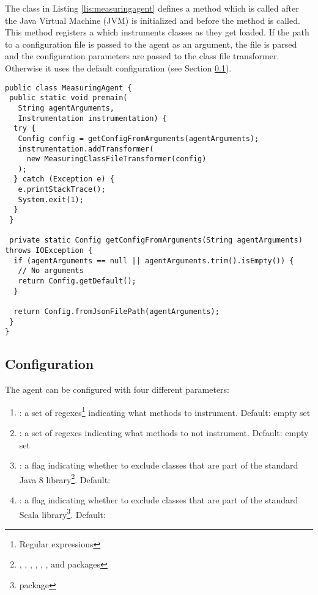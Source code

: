 \noindent The  class in Listing \ref{lis:measuringagent} defines a  method which is called after the Java Virtual Machine (JVM) is initialized and before the  method is called. This method registers a  which instruments classes as they get loaded. If the path to a configuration file is passed to the agent as an argument, the file is parsed and the configuration parameters are passed to the class file transformer. Otherwise it uses the default configuration (see Section \ref{sec:implementation:agent:configuration}).

\begin{lstlisting}[breaklines,caption={$MeasuringAgent$ class},label=lis:measuringagent]
public class MeasuringAgent {
 public static void premain(
   String agentArguments,
   Instrumentation instrumentation) {
  try {
   Config config = getConfigFromArguments(agentArguments);
   instrumentation.addTransformer(
     new MeasuringClassFileTransformer(config)
   );
  } catch (Exception e) {
   e.printStackTrace();
   System.exit(1);
  }
 }

 private static Config getConfigFromArguments(String agentArguments) throws IOException {
  if (agentArguments == null || agentArguments.trim().isEmpty()) {
   // No arguments
   return Config.getDefault();
  }

  return Config.fromJsonFilePath(agentArguments);
 }
}
\end{lstlisting}

\subsection{Configuration}
\label{sec:implementation:agent:configuration}
The agent can be configured with four different parameters:
\begin{enumerate}
  \item \textbf{}: a set of regexes\footnote{Regular expressions} indicating what methods to instrument. Default: empty set
  \item \textbf{}: a set of regexes indicating what methods to not instrument. Default: empty set
  \item \textbf{}: a flag indicating whether to exclude classes that are part of the standard Java 8 library\footnote{, , , , , ,  and  packages}. Default: 
  \item \textbf{}:  a flag indicating whether to exclude classes that are part of the standard Scala library\footnote{ package}. Default: 
\end{enumerate}

